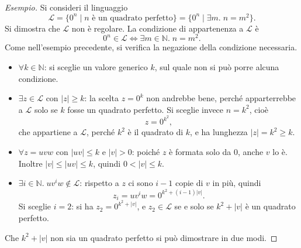 \documentclass[a4paper, 11pt, oneside]{book}
\theoremstyle{formale}
\newenvironment{esempio}
    {\begin{proof}[\textit{Esempio}]\renewcommand{\qedsymbol}{$\diamond$}}
    {\end{proof}}
\begin{document}
    \begin{esempio}
        Si consideri il linguaggio
        \begin{equation*}
            \mathcal{L} = \{0^n \mid n \text{ \`e un quadrato perfetto}\}
            = \{0^n \mid \exists m.\; n = m^2\}.
        \end{equation*}
        Si dimostra che $\mathcal{L}$ non \`e regolare. La condizione di appartenenza a
        $\mathcal{L}$ \`e
        \begin{equation*}
            0^n \in \mathcal{L} \iff \exists m \in \mathbb{N}.\; n = m^2.
        \end{equation*}
        Come nell'esempio precedente, si verifica la negazione della condizione necessaria.
        \begin{itemize}
            \item $\forall k \in \mathbb{N}$: si sceglie un valore generico $k$, sul quale
                non si pu\`o porre alcuna condizione.
            \item $\exists z \in \mathcal{L}$ con $|z| \geq k$: la scelta $z = 0^k$ non
                andrebbe bene, perch\'e apparterrebbe a $\mathcal{L}$ solo se $k$ fosse un
                quadrato perfetto. Si sceglie invece $n = k^2$, cio\`e
                \begin{equation*}
                    z = 0^{k^2},
                \end{equation*}
                che appartiene a $\mathcal{L}$, perch\'e $k^2$ \`e il quadrato di $k$, e ha
                lunghezza $|z| = k^2 \geq k$.
            \item $\forall z = uvw$ con $|uv| \leq k$ e $|v| > 0$: poich\'e $z$ \`e formata
                solo da $0$, anche $v$ lo \`e. Inoltre $|v| \leq |uv| \leq k$, quindi
                $0 < |v| \leq k$.
            \item $\exists i \in \mathbb{N}.\; uv^i w \notin \mathcal{L}$: rispetto a $z$ ci
                sono $i - 1$ copie di $v$ in pi\`u, quindi
                \begin{equation*}
                    z_i = uv^i w = 0^{k^2 + (i - 1)|v|}.
                \end{equation*}
                Si sceglie $i = 2$: si ha $z_2 = 0^{k^2 + |v|}$, e $z_2 \in \mathcal{L}$ se
                e solo se $k^2 + |v|$ \`e un quadrato perfetto.
        \end{itemize}
        Che $k^2 + |v|$ non sia un quadrato perfetto si pu\`o dimostrare in due modi.


\end{esempio}
\end{document}

